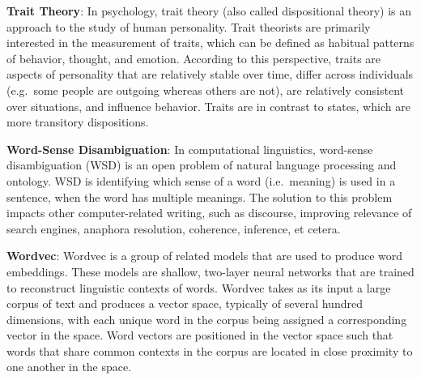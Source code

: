 \documentclass[]{book}
\theoremstyle{definition}
\theoremstyle{definition}
\theoremstyle{definition}
\theoremstyle{remark}
\begin{document}
\textbf{Trait Theory}: In psychology, trait theory (also called
dispositional theory) is an approach to the study of human personality.
Trait theorists are primarily interested in the measurement of traits,
which can be defined as habitual patterns of behavior, thought, and
emotion. According to this perspective, traits are aspects of
personality that are relatively stable over time, differ across
individuals (e.g.~some people are outgoing whereas others are not), are
relatively consistent over situations, and influence behavior. Traits
are in contrast to states, which are more transitory dispositions.

\textbf{Word-Sense Disambiguation}: In computational linguistics,
word-sense disambiguation (WSD) is an open problem of natural language
processing and ontology. WSD is identifying which sense of a word
(i.e.~meaning) is used in a sentence, when the word has multiple
meanings. The solution to this problem impacts other computer-related
writing, such as discourse, improving relevance of search engines,
anaphora resolution, coherence, inference, et cetera.

\textbf{Wordvec}: Wordvec is a group of related models that are used to
produce word embeddings. These models are shallow, two-layer neural
networks that are trained to reconstruct linguistic contexts of words.
Wordvec takes as its input a large corpus of text and produces a vector
space, typically of several hundred dimensions, with each unique word in
the corpus being assigned a corresponding vector in the space. Word
vectors are positioned in the vector space such that words that share
common contexts in the corpus are located in close proximity to one
another in the space.


\end{document}
